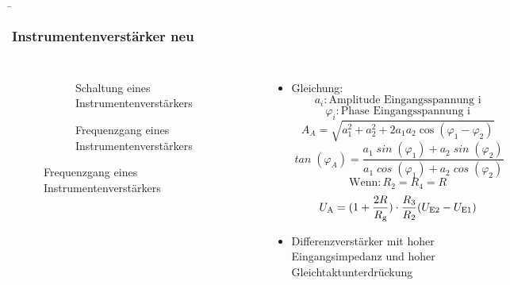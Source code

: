 \begin{frame}
    \b{
    \frametitle{Instrumentenverstärker neu}
    \begin{columns}
        \centering
        \begin{figure}
    \centering

    \begin{subfigure}{\linewidth}
        \centering
        \resizebox{0.6\linewidth}{!}{}
        \caption{Schaltung eines Instrumentenverstärkers}
    \end{subfigure}

    \vspace{0.5cm} 

    \begin{subfigure}{\linewidth}
        \centering
        \resizebox{0.6\linewidth}{!}{}
        \caption{Frequenzgang eines Instrumentenverstärkers}
    \end{subfigure}

\end{figure}

        \raggedleft
        \begin{itemize}
            \item Gleichung:
         \[
\mathit{a_i} : \text{Amplitude Eingangsspannung i}
\]
\[
\mathit{\varphi_i} : \text{Phase Eingangsspannung i}
\]
\[
\mathit{A}_{A} = \sqrt{a_1^2 + a_2^2 + 2a_1a_2 \cos(\varphi_1 - \varphi_2)}
\]
\[
\mathit{\tan}(\varphi_A) = \frac{a_1 \mathit{\sin}(\varphi_1) + a_2 \mathit{\sin}(\varphi_2)}{a_1 \mathit{\cos}(\varphi_1) + a_2 \mathit{\cos}(\varphi_2)}
\]
\[
    \text{Wenn} : R_2 = R_4 = R
\]
\[
    U_{\textnormal{A}} = (1+ \frac{2R} {R_{\textnormal{g}}}) \cdot \frac{R_3} {R_2} (U_{\textnormal{E2}}-U_{\textnormal{E1}})
\]
        \item Differenzverstärker mit hoher Eingangsimpedanz und hoher Gleichtaktunterdrückung    
    \end{itemize}
    \end{columns}
    }
\end{frame}



